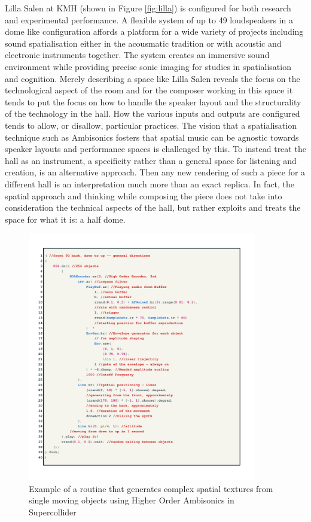 \documentclass{article}
\begin{document}
        Lilla Salen at KMH (shown in Figure \ref{fig:lilla}) is configured for both research and experimental performance. A flexible system of up to 49 loudspeakers in a dome like configuration affords a platform for a wide variety of projects including sound spatialisation either in the acousmatic tradition or with acoustic and electronic instruments together. The system creates an immersive sound environment while providing precise sonic imaging for studies in spatialisation and cognition. Merely describing a space like Lilla Salen reveals the focus on the technological aspect of the room and for the composer working in this space it tends to put the focus on how to handle the speaker layout and the structurality of the technology in the hall. How the various inputs and outputs are configured tends to allow, or disallow, particular practices. The vision that a spatialisation technique such as Ambisonics fosters that spatial music can be agnostic towards speaker layouts and performance spaces is challenged by this. To instead treat the hall as an instrument, a specificity rather than a general space for listening and creation, is an alternative approach. Then any new rendering of such a piece for a different hall is an interpretation much more than an exact replica. In fact, the spatial approach and thinking while composing the piece does not take into consideration the technical aspects of the hall, but rather exploits and treats the space for what it is: a half dome.\\
     \begin{figure}[h]
	\centering
	\hspace*{-1.25cm}\includegraphics[scale = 1, width = 10cm]{SMC_2024_Paper/code.pdf}
	\caption{Example of a routine that generates complex spatial textures from single moving objects using Higher Order Ambisonics in Supercollider\label{code}}
\end{figure}
\end{document}
